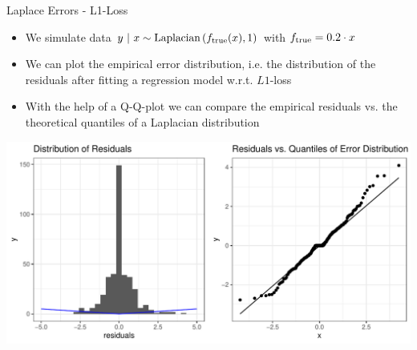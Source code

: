 \documentclass[11pt,compress,t,notes=noshow, xcolor=table]{beamer}
\begin{document}
\begin{vbframe}{Laplace Errors - L1-Loss}
\framebreak 

\begin{footnotesize}
\begin{itemize}
	\item We simulate data $y ~|~x \sim \text{Laplacian}\left(f_{\text{true}}(x), 1\right)$ with $f_{\text{true}} = 0.2 \cdot x$
\item We can plot the empirical error distribution, i.e. the distribution of the residuals after fitting a regression model w.r.t. $L1$-loss
\item With the help of a Q-Q-plot we can compare the empirical residuals vs. the theoretical quantiles of a Laplacian distribution  
\end{itemize}
\end{footnotesize}
\includegraphics{figure/residuals_plot_L1.pdf}



\end{vbframe}
\end{document}
